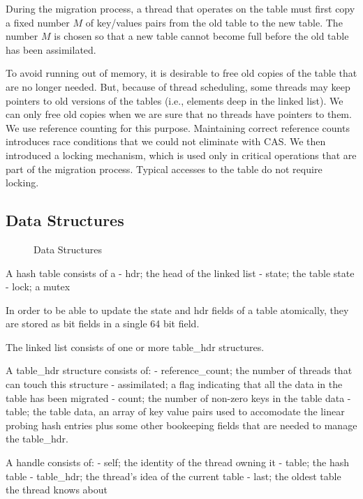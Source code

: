During the migration process, a thread that operates on the table must
first copy a fixed number $M$ of key/values pairs from the old table
to the new table. The number $M$ is chosen so that a new table cannot
become full before the old table has been assimilated.

To avoid running out of memory, it is desirable to free old copies of
the table that are no longer needed. But, because of thread
scheduling, some threads may keep pointers to old versions of the
tables (i.e., elements deep in the linked list). We can only free old
copies when we are sure that no threads have pointers to them. We use
reference counting for this purpose. Maintaining correct reference
counts introduces race conditions that we could not eliminate with
CAS.  We then introduced a locking mechanism, which is used only in
critical operations that are part of the migration process. Typical
accesses to the table do not require locking.


\subsection{Data Structures}

\begin{figure}
  \begin{center}
    
  \end{center}
  \caption{Data Structures}
  \label{fig:datastructures}
\end{figure}

A hash table consists of a
  - hdr; the head of the linked list
  - state; the table state 
  - lock; a mutex

In order to be able to update the state and hdr fields of a table
atomically, they are stored as bit fields in a single 64 bit field.

The linked list consists of one or more table_hdr structures.

A table_hdr structure consists of:
 - reference_count; the number of threads that can touch this structure
 - assimilated; a flag indicating that all the data in the table has been migrated
 - count; the number of non-zero keys in the table data
 - table; the table data, an array of key value pairs used to accomodate the linear probing hash entries
plus some other bookeeping fields that are needed to manage the table_hdr.


A handle consists of:
 - self; the identity of the thread owning it
 - table; the hash table
 - table_hdr; the thread's idea of the current table
 - last; the oldest table the thread knows about


